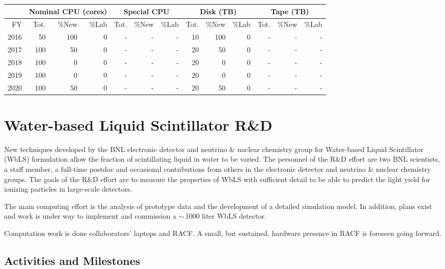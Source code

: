 \documentclass[pdftex,12pt,letter]{article}
\begin{document}
\begin{tabular}[h]{|r || r|r|r || r|r|r || r|r|r || r|r|r ||}
  \hline
   & \multicolumn{3}{c||}{Nominal CPU (cores)} & \multicolumn{3}{c||}{Special CPU} & \multicolumn{3}{c||}{Disk (TB)} & \multicolumn{3}{c||}{Tape (TB)} \\
   \hline
  FY & Tot. & \%New & \%Lab & Tot. & \%New & \%Lab & Tot. & \%New & \%Lab & Tot. & \%New & \%Lab \\
  \hline
  2016 & 50 &100 &0 &- &- &- & 10& 100&0 &- &- &- \\
  \hline
  2017 & 100& 50& 0&- &- &- & 20& 50&0 &- &- &-  \\
  \hline
  2018 & 100& 0& 0&- &- &- & 20& 0&0 &- &- &-  \\
  \hline
  2019 & 100& 0& 0&- &- &- & 20& 0&0 &- &- &-  \\
  \hline
  2020 & 100& 50& 0&- &- &- & 20& 50&0 &- &- &-  \\
  \hline
\end{tabular}

\pagebreak
\section{Water-based Liquid Scintillator R\&D}
New techniques developed by the BNL electronic detector and neutrino
\& nuclear chemistry group for Water-based Liquid Scintillator (WbLS)
formulation allow the fraction of scintillating liquid in water to be
varied. 
The personnel of the R\&D effort are two BNL scientists, a staff
member, a full-time postdoc and occasional contributions from others
in the electronic detector and neutrino \& nuclear chemistry groups.   
The goals of the R\&D effort are to measure the properties of WbLS
with sufficient detail to be able to predict the light yield for
ionizing particles in large-scale detectors.

The main computing effort is the analysis of prototype data and the development of a detailed
simulation model. In addition, plans exist and work is under way to implement and commission a 
$\sim$\,1000 liter WbLS detector.

Computation work is done collaborators' laptops and RACF. A small, but sustained, hardware
presence in RACF is foreseen going forward.

\subsection{Activities and Milestones}
\end{document}

